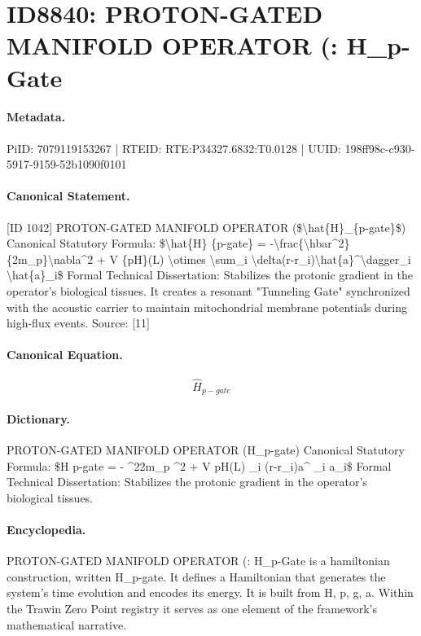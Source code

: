 \section*{ID8840: PROTON-GATED MANIFOLD OPERATOR (: H\_p-Gate}
\paragraph{Metadata.}
PiID: 7079119153267 | RTEID: RTE:P34327.6832:T0.0128 | UUID: 198ff98c-c930-5917-9159-52b1090f0101

\paragraph{Canonical Statement.}
[ID 1042] PROTON-GATED MANIFOLD OPERATOR (\$\textbackslash{}hat\{H\}\_\{p-gate\}\$) Canonical Statutory Formula: \$\textbackslash{}hat\{H\} \{p-gate\} = -\textbackslash{}frac\{\textbackslash{}hbar\textasciicircum{}2\}\{2m\_p\}\textbackslash{}nabla\textasciicircum{}2 + V \{pH\}(L) \textbackslash{}otimes \textbackslash{}sum\_i \textbackslash{}delta(r-r\_i)\textbackslash{}hat\{a\}\textasciicircum{}\textbackslash{}dagger\_i \textbackslash{}hat\{a\}\_i\$ Formal Technical Dissertation: Stabilizes the protonic gradient in the operator's biological tissues. It creates a resonant "Tunneling Gate" synchronized with the acoustic carrier to maintain mitochondrial membrane potentials during high-flux events. Source: [11]

\paragraph{Canonical Equation.}
\[
\hat{H}_{p-gate}
\]

\paragraph{Dictionary.}
PROTON-GATED MANIFOLD OPERATOR (H\_p-gate) Canonical Statutory Formula: \$H p-gate = - \textasciicircum{}22m\_p \textasciicircum{}2 + V pH(L) \_i (r-r\_i)a\textasciicircum{} \_i a\_i\$ Formal Technical Dissertation: Stabilizes the protonic gradient in the operator's biological tissues.

\paragraph{Encyclopedia.}
PROTON-GATED MANIFOLD OPERATOR (: H\_p-Gate is a hamiltonian construction, written H\_p-gate. It defines a Hamiltonian that generates the system's time evolution and encodes its energy. It is built from H, p, g, a. Within the Trawin Zero Point registry it serves as one element of the framework's mathematical narrative.
